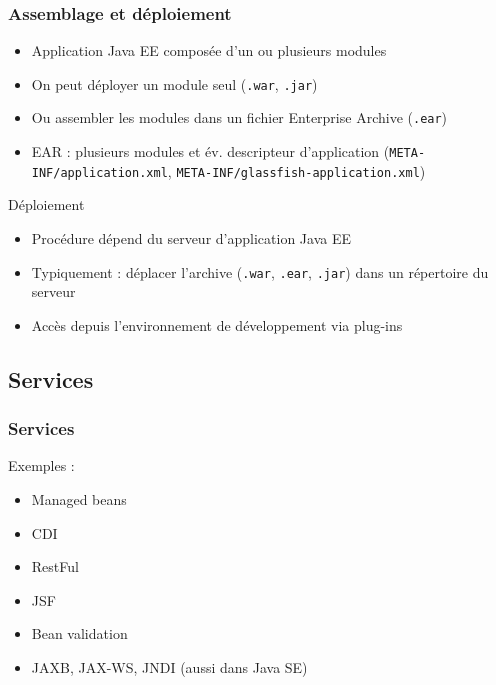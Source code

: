 \documentclass[english, french]{beamer}
\begin{document}
\begin{frame}
	\frametitle{Assemblage et déploiement}
	\begin{itemize}
		\item Application Java EE composée d’un ou plusieurs modules
		\item On peut déployer un module seul (\texttt{.war}, \texttt{.jar})
		\item Ou assembler les modules dans un fichier Enterprise Archive (\texttt{.ear})
		\item EAR : plusieurs modules et év. descripteur d’application (\texttt{META-INF/application.xml}, \texttt{META-INF/glassfish-application.xml})
	\end{itemize}
	\begin{block}{Déploiement}
		\begin{itemize}
			\item Procédure dépend du serveur d’application Java EE
			\item Typiquement : déplacer l’archive (\texttt{.war}, \texttt{.ear}, \texttt{.jar}) dans un répertoire du serveur
			\item Accès depuis l’environnement de développement via plug-ins
		\end{itemize}
	\end{block}
\end{frame}

\subsection{Services}
\begin{frame}
	\frametitle{Services}
	Exemples :
	\begin{itemize}
		\item Managed beans
		\item CDI
		\item RestFul
		\item JSF
		\item Bean validation
		\item JAXB, JAX-WS, JNDI (aussi dans Java SE)
	\end{itemize}
\end{frame}
\end{document}
